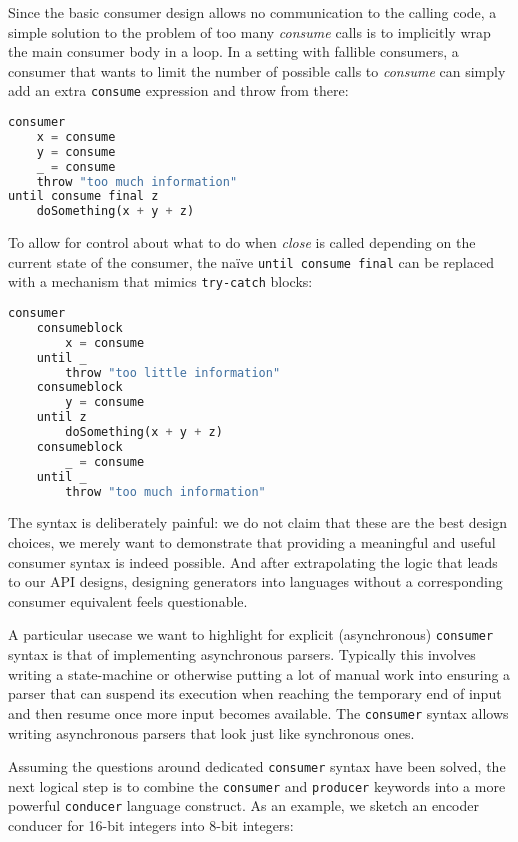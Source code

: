 \documentclass[sigplan,screen,10pt,review]{acmart}
\begin{document}
Since the basic consumer design allows no communication to the calling code, a simple solution to the problem of too many \textit{consume} calls is to implicitly wrap the main consumer body in a loop. In a setting with fallible consumers, a consumer that wants to limit the number of possible calls to \textit{consume} can simply add an extra \texttt{consume} expression and throw from there:

\begin{lstlisting}[language=Python]
consumer
    x = consume
    y = consume
    _ = consume
    throw "too much information"
until consume final z
    doSomething(x + y + z)
\end{lstlisting}

To allow for control about what to do when \textit{close} is called depending on the current state of the consumer, the naïve \texttt{until consume final} can be replaced with a mechanism that mimics \texttt{try-catch} blocks:

\begin{lstlisting}[language=Python]
consumer
    consumeblock
        x = consume
    until _
        throw "too little information"
    consumeblock
        y = consume
    until z
        doSomething(x + y + z)
    consumeblock
        _ = consume
    until _
        throw "too much information"
\end{lstlisting}

The syntax is deliberately painful: we do not claim that these are the best design choices, we merely want to demonstrate that providing a meaningful and useful consumer syntax is indeed possible. And after extrapolating the logic that leads to our API designs, designing generators into languages without a corresponding consumer equivalent feels questionable.

A particular usecase we want to highlight for explicit (asynchronous) \texttt{consumer} syntax is that of implementing asynchronous parsers. Typically this involves writing a state-machine or otherwise putting a lot of manual work into ensuring a parser that can suspend its execution when reaching the temporary end of input and then resume once more input becomes available. The \texttt{consumer} syntax allows writing asynchronous parsers that look just like synchronous ones.

Assuming the questions around dedicated \texttt{consumer} syntax have been solved, the next logical step is to combine the \texttt{consumer} and \texttt{producer} keywords into a more powerful \texttt{conducer} language construct. As an example, we sketch an encoder conducer for 16-bit integers into 8-bit integers:
\end{document}
